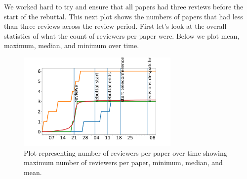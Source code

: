 We worked hard to try and ensure that all papers had three reviews
before the start of the rebuttal. This next plot shows the numbers of
papers that had less than three reviews across the review period. First
let's look at the overall statistics of what the count of reviewers per
paper were. Below we plot mean, maximum, median, and minimum over time.

\begin{Shaded}
\begin{Highlighting}[]
\OperatorTok{=}\OperatorTok{=}\NormalTok{)}
\OperatorTok{=}\NormalTok{ lastseen[}\NormalTok{]}

\OperatorTok{=}\OperatorTok{=}\OperatorTok{=}
\OperatorTok{=}\OperatorTok{=}\OperatorTok{=}\NormalTok{)}
\OperatorTok{=}\NormalTok{)}
\OperatorTok{=}\NormalTok{)    }
\OperatorTok{=}
\NormalTok{        review\_count[col][review\_count.index}\OperatorTok{\textgreater{}}\NormalTok{lastseen[col]] }\OperatorTok{=}
        
\OperatorTok{=}
\end{Highlighting}
\end{Shaded}

\begin{figure}[htb]
\includegraphics[width=0.70\textwidth]{diagrams/neurips/number-of-reviews-over-time.pdf}


\caption{Plot representing number of reviewers per paper over time showing maximum number of reviewers per paper, minimum, median, and mean. }
\label{number-of-reviews-over-time}
\end{figure}

